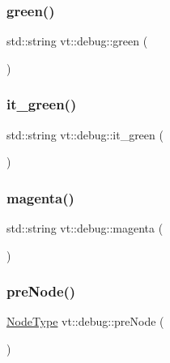 \subsubsection{\texorpdfstring{green()}{green()}}
{\footnotesize\ttfamily std\+::string vt\+::debug\+::green (\begin{DoxyParamCaption}{ }\end{DoxyParamCaption})\hspace{0.3cm}{\ttfamily [inline]}}

\mbox{\label{namespacevt_1_1debug_a749c31dee324cac600ec442f9f39eb7c}} 
\subsubsection{\texorpdfstring{it\+\_\+green()}{it\_green()}}
{\footnotesize\ttfamily std\+::string vt\+::debug\+::it\+\_\+green (\begin{DoxyParamCaption}{ }\end{DoxyParamCaption})\hspace{0.3cm}{\ttfamily [inline]}}

\mbox{\label{namespacevt_1_1debug_a1617ac1c602fb27518f6ab8fd4bf99c1}} 
\subsubsection{\texorpdfstring{magenta()}{magenta()}}
{\footnotesize\ttfamily std\+::string vt\+::debug\+::magenta (\begin{DoxyParamCaption}{ }\end{DoxyParamCaption})\hspace{0.3cm}{\ttfamily [inline]}}

\mbox{\label{namespacevt_1_1debug_a0f9acc324c2b3308760aa13b29dd9736}} 
\subsubsection{\texorpdfstring{pre\+Node()}{preNode()}}
{\footnotesize\ttfamily \hyperlink{namespacevt_a866da9d0efc19c0a1ce79e9e492f47e2}{Node\+Type} vt\+::debug\+::pre\+Node (\begin{DoxyParamCaption}{ }\end{DoxyParamCaption})}

